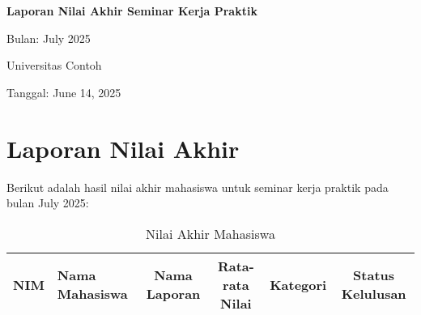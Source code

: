 \documentclass[a4paper,12pt]{article}
\begin{document}
\begin{titlepage}
\centering
\vspace*{2cm}
{\Huge \textbf{Laporan Nilai Akhir Seminar Kerja Praktik}\par}
\vspace{1cm}
{\Large Bulan: July 2025\par}
\vspace{2cm}
{\large Universitas Contoh\par}
\vspace{1cm}
{\large Tanggal: June 14, 2025\par}
\end{titlepage}

\section*{Laporan Nilai Akhir}
Berikut adalah hasil nilai akhir mahasiswa untuk seminar kerja praktik pada bulan July 2025:

\begin{landscape}
\begin{table}[h]
\centering
\caption{Nilai Akhir Mahasiswa}
\begin{tabular}{llcccc}
\toprule
\textbf{NIM} & \textbf{Nama Mahasiswa} & \textbf{Nama Laporan} & \textbf{Rata-rata Nilai} & \textbf{Kategori} & \textbf{Status Kelulusan} \\ \midrule
\bottomrule
\end{tabular}
\end{table}
\end{landscape}
\end{document}
